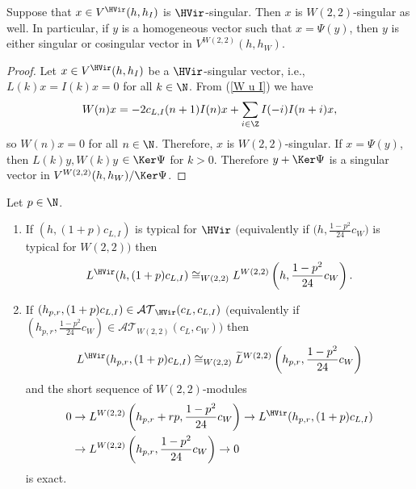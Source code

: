 \begin{Lemma}\label{H-sing je W-sing}Suppose that $x\in V^{\HVir}(h,h_I)$ is $\HVir$-singular. Then $x$ is $W(2,2)$-singular as well. In particular, if $y$ is a homogeneous vector such that $x = \Psi(y)$, then $y$ is either singular or cosingular vector in $V^{W(2,2)}(h,h_W)$.
\end{Lemma}

\begin{proof}
Let $x\in V^{\HVir}(h,h_I)$ be a $\HVir$-singular vector, i.e., $L(k)x=I(k)x=0$ for all $k\in\N$. From (\ref{W u I}) we have
\begin{gather*}
W(n)x = -2c_{L,I}(n+1) I(n)x+\sum_{i\in \Z}I(-i)I(n+i)x,
\end{gather*}
so $W(n)x=0$ for all $n\in\N$. Therefore, $x$ is $W(2,2)$-singular.
If $x=\Psi(y)$, then $L(k)y, W(k)y$ $\in \Ker \Psi$ for $k>0$. Therefore $y + \Ker \Psi$ is a singular vector in $V^{W(2,2)}(h,h_W) / \Ker \Psi$.
\end{proof}

\begin{Theorem} \label{t33} \label{L za +}Let $p\in\N$.
\begin{enumerate}\itemsep=0pt
\item[$(i)$] If $(h,(1+p) c_{L,I})$ is typical for $\HVir$ $($equivalently if $\big(h,\frac{1-p^{2}}{24}c_{W}\big) $ is typical for $W(2,2))$ then
\begin{gather}
L^{\HVir}(h,(1+p) c_{L,I}) \cong_{W(2,2) }L^{W(2,2)}\left( h,\frac{1-p^{2}}{24}c_{W}\right).\label{L + gen}
\end{gather}

\item[$(ii)$] If $(h_{p,r},(1+p) c_{L,I}) \in {\mathcal {AT} }_{\HVir} ( c_L, c_{L,I} )$ $($equivalently if $ (h_{p,r},\frac{1-p^{2}}{24}c_{W}) \in {\mathcal {AT} }_{W(2,2)} ( c_L, c_W ))$ then
\begin{gather*}
L^{\HVir}(h_{p,r},(1+p) c_{L,I}) \cong_{W(2,2) }\widetilde{L}^{W(2,2)}\left( h_{p,r},\frac{1-p^{2}}{24}c_{W}\right) %
\end{gather*}
and the short sequence of $W(2,2)$-modules
\begin{align}
0 & \rightarrow L^{W(2,2)}\left( h_{p,r}+rp,\frac{1-p^{2}}{24}c_{W}\right)\rightarrow L^{\HVir}(h_{p,r},(1+p) c_{L,I}) \label{seq +} \\
& \rightarrow L^{W(2,2)}\left( h_{p,r},\frac{1-p^{2}}{24}c_{W}\right) \rightarrow0 \nonumber
\end{align}
is exact.
\end{enumerate}
\end{Theorem}

